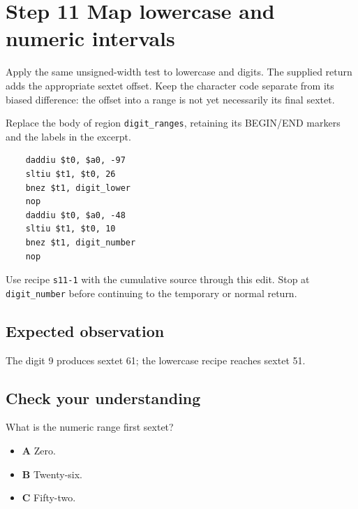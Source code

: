 \section{Step 11 Map lowercase and numeric intervals}\label{base64-s11}

Apply the same unsigned-width test to lowercase and digits. The supplied return adds the appropriate sextet offset. Keep the character code separate from its biased difference: the offset into a range is not yet necessarily its final sextet.

Replace the body of region \texttt{digit\_ranges}, retaining its BEGIN/END markers and the labels in the excerpt.

\begin{verbatim}
    daddiu $t0, $a0, -97
    sltiu $t1, $t0, 26
    bnez $t1, digit_lower
    nop
    daddiu $t0, $a0, -48
    sltiu $t1, $t0, 10
    bnez $t1, digit_number
    nop
\end{verbatim}

Use recipe \texttt{s11-1} with the cumulative source through this edit. Stop at \texttt{digit\_number} before continuing to the temporary or normal return.

\subsection{Expected observation}
The digit 9 produces sextet 61; the lowercase recipe reaches sextet 51.

\subsection{Check your understanding}
What is the numeric range first sextet?

\begin{itemize}
  \item \textbf{A} Zero.
  \item \textbf{B} Twenty-six.
  \item \textbf{C} Fifty-two.
\end{itemize}
